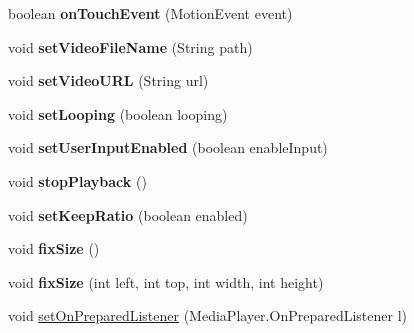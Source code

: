 \begin{DoxyCompactItemize}
boolean {\bfseries on\+Touch\+Event} (Motion\+Event event)
\item 
\mbox{\label{classorg_1_1cocos2dx_1_1lib_1_1Cocos2dxVideoView_af89cc84bdf18ef097a6a9ebc74fb7d46}} 
void {\bfseries set\+Video\+File\+Name} (String path)
\item 
\mbox{\label{classorg_1_1cocos2dx_1_1lib_1_1Cocos2dxVideoView_abe7af1366202168d4f1c77a37438e70d}} 
void {\bfseries set\+Video\+U\+RL} (String url)
\item 
\mbox{\label{classorg_1_1cocos2dx_1_1lib_1_1Cocos2dxVideoView_a6b535ca589ec9760d8aa05ccf4ac2fed}} 
void {\bfseries set\+Looping} (boolean looping)
\item 
\mbox{\label{classorg_1_1cocos2dx_1_1lib_1_1Cocos2dxVideoView_ae354adf5e8bdc8ae1315daf9162bbfd5}} 
void {\bfseries set\+User\+Input\+Enabled} (boolean enable\+Input)
\item 
\mbox{\label{classorg_1_1cocos2dx_1_1lib_1_1Cocos2dxVideoView_a0e4e25e30423970591688c0d92c7b51b}} 
void {\bfseries stop\+Playback} ()
\item 
\mbox{\label{classorg_1_1cocos2dx_1_1lib_1_1Cocos2dxVideoView_a64fe52e924a3bf8f7274ec71695c9392}} 
void {\bfseries set\+Keep\+Ratio} (boolean enabled)
\item 
\mbox{\label{classorg_1_1cocos2dx_1_1lib_1_1Cocos2dxVideoView_a633e74716128efed6bc877a90ada817c}} 
void {\bfseries fix\+Size} ()
\item 
\mbox{\label{classorg_1_1cocos2dx_1_1lib_1_1Cocos2dxVideoView_acdab01e2fdb684ebb7004aad55ce0c5b}} 
void {\bfseries fix\+Size} (int left, int top, int width, int height)
\item 
void \hyperlink{classorg_1_1cocos2dx_1_1lib_1_1Cocos2dxVideoView_a34adbafe6cb1d475874ac9ffbde8d0cd}{set\+On\+Prepared\+Listener} (Media\+Player.\+On\+Prepared\+Listener l)

\end{DoxyCompactItemize}
